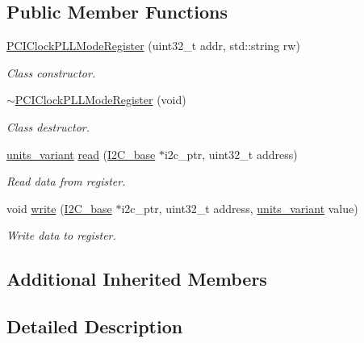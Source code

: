 \subsection*{Public Member Functions}
\begin{DoxyCompactItemize}
\item 
\hyperlink{class_p_c_i_clock_p_l_l_mode_register_a4de3ed4f37d4b7dd375547268223c0c8}{P\+C\+I\+Clock\+P\+L\+L\+Mode\+Register} (uint32\+\_\+t addr, std\+::string rw)
\begin{DoxyCompactList}\small\item\em Class constructor. \end{DoxyCompactList}\item 
\hyperlink{class_p_c_i_clock_p_l_l_mode_register_af716c5dbd320aae13b50f1ba06edd3f6}{$\sim$\+P\+C\+I\+Clock\+P\+L\+L\+Mode\+Register} (void)
\begin{DoxyCompactList}\small\item\em Class destructor. \end{DoxyCompactList}\item 
\hyperlink{units__define_8hpp_a95d46867fa79633565c288a0b4bd5408}{units\+\_\+variant} \hyperlink{class_p_c_i_clock_p_l_l_mode_register_afb680bb132c11af7c7f8ed5cba6a7150}{read} (\hyperlink{class_i2_c__base}{I2\+C\+\_\+base} $\ast$i2c\+\_\+ptr, uint32\+\_\+t address)
\begin{DoxyCompactList}\small\item\em Read data from register. \end{DoxyCompactList}\item 
void \hyperlink{class_p_c_i_clock_p_l_l_mode_register_a19290b05f08da81c02cf34c9730f2b17}{write} (\hyperlink{class_i2_c__base}{I2\+C\+\_\+base} $\ast$i2c\+\_\+ptr, uint32\+\_\+t address, \hyperlink{units__define_8hpp_a95d46867fa79633565c288a0b4bd5408}{units\+\_\+variant} value)
\begin{DoxyCompactList}\small\item\em Write data to register. \end{DoxyCompactList}\end{DoxyCompactItemize}
\subsection*{Additional Inherited Members}


\subsection{Detailed Description}


